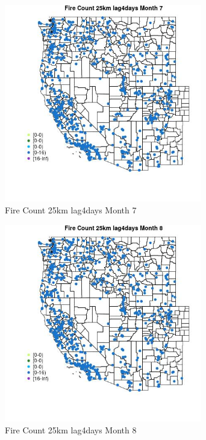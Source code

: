 \begin{figure} 
\centering  
\includegraphics[width=0.77\textwidth]{Code_Outputs/Report_ML_input_PM25_Step4_part_e_de_duplicated_aves_compiled_2019-05-21wNAs_MapObsMo7Fire_Count_25km_lag4days.jpg} 
\caption{\label{fig:Report_ML_input_PM25_Step4_part_e_de_duplicated_aves_compiled_2019-05-21wNAsMapObsMo7Fire_Count_25km_lag4days}Fire Count 25km lag4days Month 7} 
\end{figure} 
 

\begin{figure} 
\centering  
\includegraphics[width=0.77\textwidth]{Code_Outputs/Report_ML_input_PM25_Step4_part_e_de_duplicated_aves_compiled_2019-05-21wNAs_MapObsMo8Fire_Count_25km_lag4days.jpg} 
\caption{\label{fig:Report_ML_input_PM25_Step4_part_e_de_duplicated_aves_compiled_2019-05-21wNAsMapObsMo8Fire_Count_25km_lag4days}Fire Count 25km lag4days Month 8} 
\end{figure} 
 

